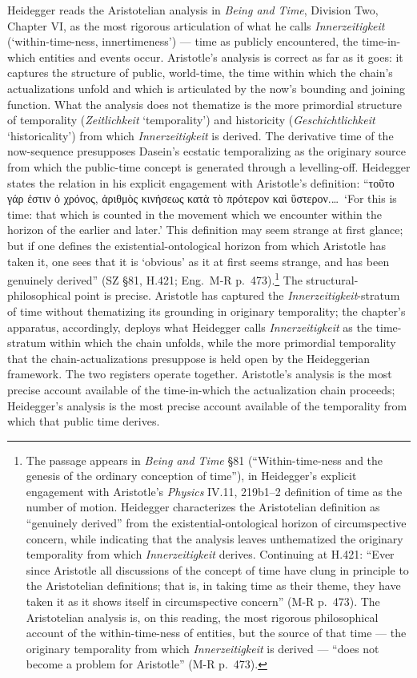 \documentclass{article}
\newcommand{\gk}[1]{{\greekfont #1}}
\begin{document}
Heidegger reads the Aristotelian analysis in \textit{Being and Time}, Division Two, Chapter VI, as the most rigorous articulation of what he calls \textit{Innerzeitigkeit} (`within-time-ness, innertimeness') --- time as publicly encountered, the time-in-which entities and events occur. Aristotle's analysis is correct as far as it goes: it captures the structure of public, world-time, the time within which the chain's actualizations unfold and which is articulated by the now's bounding and joining function. What the analysis does not thematize is the more primordial structure of temporality (\textit{Zeitlichkeit} `temporality') and historicity (\textit{Geschichtlichkeit} `historicality') from which \textit{Innerzeitigkeit} is derived. The derivative time of the now-sequence presupposes Dasein's ecstatic temporalizing as the originary source from which the public-time concept is generated through a levelling-off. Heidegger states the relation in his explicit engagement with Aristotle's definition: ``\gk{τοῦτο γάρ ἐστιν ὁ χρόνος, ἀριθμὸς κινήσεως κατὰ τὸ πρότερον καὶ ὕστερον}.\ldots\ `For this is time: that which is counted in the movement which we encounter within the horizon of the earlier and later.' This definition may seem strange at first glance; but if one defines the existential-ontological horizon from which Aristotle has taken it, one sees that it is `obvious' as it at first seems strange, and has been genuinely derived'' (SZ \S 81, H.421; Eng.~M-R p.~473).\footnote{The passage appears in \textit{Being and Time} \S 81 (``Within-time-ness and the genesis of the ordinary conception of time''), in Heidegger's explicit engagement with Aristotle's \textit{Physics} IV.11, 219b1--2 definition of time as the number of motion. Heidegger characterizes the Aristotelian definition as ``genuinely derived'' from the existential-ontological horizon of circumspective concern, while indicating that the analysis leaves unthematized the originary temporality from which \textit{Innerzeitigkeit} derives. Continuing at H.421: ``Ever since Aristotle all discussions of the concept of time have clung in principle to the Aristotelian definitions; that is, in taking time as their theme, they have taken it as it shows itself in circumspective concern'' (M-R p.~473). The Aristotelian analysis is, on this reading, the most rigorous philosophical account of the within-time-ness of entities, but the source of that time --- the originary temporality from which \textit{Innerzeitigkeit} is derived --- ``does not become a problem for Aristotle'' (M-R p.~473).} The structural-philosophical point is precise. Aristotle has captured the \textit{Innerzeitigkeit}-stratum of time without thematizing its grounding in originary temporality; the chapter's apparatus, accordingly, deploys what Heidegger calls \textit{Innerzeitigkeit} as the time-stratum within which the chain unfolds, while the more primordial temporality that the chain-actualizations presuppose is held open by the Heideggerian framework. The two registers operate together. Aristotle's analysis is the most precise account available of the time-in-which the actualization chain proceeds; Heidegger's analysis is the most precise account available of the temporality from which that public time derives.
\end{document}
